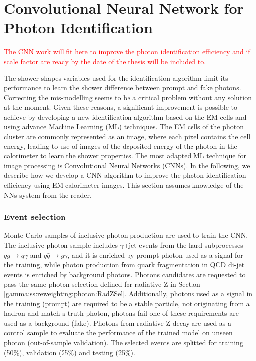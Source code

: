 \section{Convolutional Neural Network for Photon Identification}
\label{gamma:CNN}
\textcolor{red}{The CNN work will fit here to improve the photon identification efficiency and if scale factor are ready by the date of the thesis will be included to. \\}

The shower shapes variables used for the identification algorithm limit its performance to learn the shower difference between prompt and fake photons. Correcting the mis-modelling seems to be a critical problem without any solution at the moment. Given these reasons, a significant improvement is possible to achieve by developing a new identification algorithm based on the EM cells and using advance Machine Learning (ML) techniques. The EM cells of the photon cluster are commonly represented as an image, where each pixel contains the cell energy, leading to use of images of the deposited energy of the photon in the calorimeter to learn the shower properties. The most adapted ML technique for image processing is Convolutional Neural Networks (CNNs). In the following, we describe how we develop a CNN algorithm to improve the photon identification efficiency using EM calorimeter images. This section assumes knowledge of the NNs system from the reader. 
\subsubsection{Event selection}
Monte Carlo samples of inclusive photon production are used to train the CNN. The inclusive photon sample includes $\gamma$+jet events from the hard subprocesses $qg \rightarrow q\gamma$ and $ q\bar{q}\rightarrow g\gamma$, and it is enriched by prompt photon used as a signal for the training, while photon production from quark fragmentation in QCD di-jet events is enriched by background photons. Photons candidates are requested to pass the same photon selection defined for radiative Z in Section \ref{gamma:ss:reweighting:photon:RadZSel}. Additionally, photons used as a signal in the training (prompt) are required to be a stable particle, not originating from a hadron and match a truth photon, photons fail one of these requirements are used as a background (fake). Photons from radiative Z decay are used as a control sample to evaluate the performance of the trained model on unseen photon (out-of-sample validation). The selected events are splitted for training (50\%), validation (25\%) and testing (25\%). 
